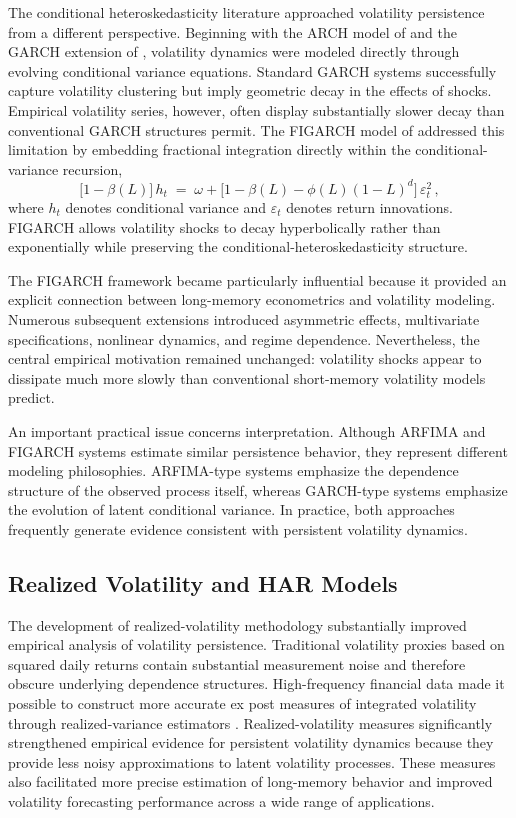 \documentclass[jrfm,article,submit,moreauthors,pdftex]{Definitions/mdpi}
\begin{document}
The conditional heteroskedasticity literature approached volatility
persistence from a different perspective. Beginning with the ARCH model of
\citet{engle1982autoregressive} and the GARCH extension of
\citet{bollerslev1986generalized}, volatility dynamics were modeled directly
through evolving conditional variance equations. Standard GARCH systems
successfully capture volatility clustering but imply geometric decay in
the effects of shocks. Empirical volatility series, however, often display
substantially slower decay than conventional GARCH structures permit. The
FIGARCH model of \citet{baillie1996fractionally} addressed this limitation
by embedding fractional integration directly within the conditional-variance
recursion,
\begin{equation}
  \bigl[1 - \beta(L)\bigr]\, h_t \;=\; \omega
  + \bigl[1 - \beta(L) - \phi(L)(1-L)^d\bigr]\, \varepsilon_t^2 \,,
\end{equation}
where $h_t$ denotes conditional variance and $\varepsilon_t$ denotes return
innovations. FIGARCH allows volatility shocks to decay hyperbolically rather
than exponentially while preserving the conditional-heteroskedasticity
structure.

The FIGARCH framework became particularly influential because it provided an
explicit connection between long-memory econometrics and volatility
modeling. Numerous subsequent extensions introduced asymmetric effects,
multivariate specifications, nonlinear dynamics, and regime dependence.
Nevertheless, the central empirical motivation remained unchanged:
volatility shocks appear to dissipate much more slowly than conventional
short-memory volatility models predict.

An important practical issue concerns interpretation. Although ARFIMA and
FIGARCH systems estimate similar persistence behavior, they represent
different modeling philosophies. ARFIMA-type systems emphasize the
dependence structure of the observed process itself, whereas GARCH-type
systems emphasize the evolution of latent conditional variance. In practice,
both approaches frequently generate evidence consistent with persistent
volatility dynamics.

\subsection{Realized Volatility and HAR Models}

The development of realized-volatility methodology substantially improved
empirical analysis of volatility persistence. Traditional volatility proxies
based on squared daily returns contain substantial measurement noise and
therefore obscure underlying dependence structures. High-frequency financial
data made it possible to construct more accurate ex post measures of
integrated volatility through realized-variance estimators
\citep{andersen2003modeling,barndorff2002econometric}.
Realized-volatility measures significantly strengthened empirical evidence
for persistent volatility dynamics because they provide less noisy
approximations to latent volatility processes. These measures also
facilitated more precise estimation of long-memory behavior and improved
volatility forecasting performance across a wide range of applications.
\end{document}
